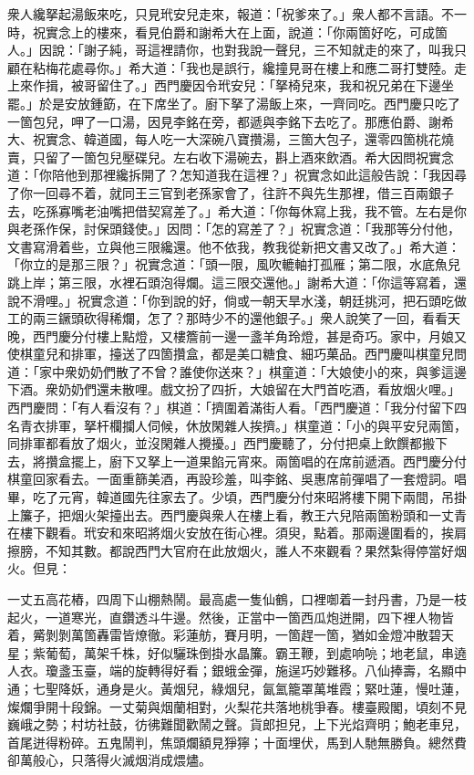 衆人纔拏起湯飯來吃，只見玳安兒走來，報道：「祝爹來了。」{}衆人都不言語。{}不一時，祝實念上的樓來，看見伯爵和謝希大在上面，說道：「你兩箇好吃，可成箇人。」因說：「謝子純，哥這裡請你，也對我說一聲兒，三不知就走的來了，叫我只顧在粘梅花處尋你。」希大道：「我也是誤行，纔撞見哥在樓上和應二哥打雙陸。走上來作揖，被哥留住了。」西門慶因令玳安兒：「拏椅兒來，我和祝兄弟在下邊坐罷。」於是安放鍾筯，在下席坐了。廚下拏了湯飯上來，一齊同吃。西門慶只吃了一箇包兒，呷了一口湯，因見李銘在旁，都遞與李銘下去吃了。那應伯爵、謝希大、祝實念、韓道國，每人吃一大深碗八寶攢湯，三箇大包子，還零四箇桃花燒賣，只留了一箇包兒壓碟兒。左右收下湯碗去，斟上酒來飲酒。希大因問祝實念道：「你陪他到那裡纔拆開了？怎知道我在這裡？」祝實念如此這般告說：「我因尋了你一回尋不着，就同王三官到老孫家會了，往許不與先生{}那裡，借三百兩銀子去，吃孫寡嘴老油嘴把借契寫差了。」希大道：「你每休寫上我，我不管。左右是你與老孫作保，討保頭錢使。」因問：「怎的寫差了？」祝實念道：「我那等分付他，文書寫滑着些，立與他三限纔還。他不依我，教我從新把文書又改了。」希大道：「你立的是那三限？」祝實念道：「頭一限，風吹轆軸打孤雁；第二限，水底魚兒跳上岸；第三限，水裡石頭泡得爛。這三限交還他。」謝希大道：「你這等寫着，還說不滑哩。」祝實念道：「你到說的好，倘或一朝天旱水淺，朝廷挑河，把石頭吃做工的兩三鐝頭砍得稀爛，怎了？那時少不的還他銀子。」{}衆人說笑了一回，看看天晚，西門慶分付樓上點燈，又樓簷前一邊一盞羊角玲燈，甚是奇巧。家中，月娘又使棋童兒和排軍，擡送了四箇攢盒，都是美口糖食、細巧菓品。西門慶叫棋童兒問道：「家中衆奶奶們散了不曾？誰使你送來？」棋童道：「大娘使小的來，與爹這邊下酒。衆奶奶們還未散哩。戲文扮了四折，大娘留在大門首吃酒，看放烟火哩。」西門慶問：「有人看沒有？」棋道：「擠圍着滿街人看。「西門慶道：「我分付留下四名青衣排軍，拏杆欄攔人伺候，休放閑雜人挨擠。」棋童道：「小的與平安兒兩箇，同排軍都看放了烟火，並沒閑雜人攪擾。」西門慶聽了，分付把桌上飲饌都搬下去，將攢盒擺上，廚下又拏上一道果餡元宵來。兩箇唱的在席前遞酒。西門慶分付棋童回家看去。一面重篩美酒，再設珍羞，叫李銘、吳惠席前彈唱了一套燈詞。唱畢，吃了元宵，韓道國先往家去了。{}少頃，西門慶分付來昭將樓下開下兩間，吊掛上簾子，把烟火架擡出去。西門慶與衆人在樓上看，教王六兒陪兩箇粉頭和一丈青在樓下觀看。玳安和來昭將烟火安放在街心裡。須臾，點着。那兩邊圍看的，挨肩擦膀，不知其數。都說西門大官府在此放烟火，誰人不來觀看？果然紮得停當好烟火。但見：

\begin{myquote}
一丈五高花樁，四周下山棚熱鬧。最高處一隻仙鶴，口裡啣着一封丹書，乃是一枝起火，一道寒光，直鑽透斗牛邊。然後，正當中一箇西瓜炮迸開，四下裡人物皆着，觱剝剝萬箇轟雷皆燎徹。彩蓮舫，賽月明，一箇趕一箇，猶如金燈冲散碧天星；紫葡萄，萬架千株，好似驪珠倒掛水晶簾。霸王鞭，到處响喨；地老鼠，串遶人衣。瓊盞玉臺，端的旋轉得好看；銀蛾金彈，施逞巧妙難移。八仙捧壽，名顯中通；七聖降妖，通身是火。黃烟兒，綠烟兒，氤氳籠罩萬堆霞；緊吐蓮，慢吐蓮，燦爛爭開十段錦。一丈菊與烟蘭相對，火梨花共落地桃爭春。樓臺殿閣，頃刻不見巍峨之勢；村坊社鼓，彷彿難聞歡鬧之聲。貨郎担兒，上下光焰齊明；鮑老車兒，首尾迸得粉碎。五鬼鬧判，焦頭爛額見猙獰；十面埋伏，馬到人馳無勝負。總然費卻萬般心，只落得火滅烟消成煨燼。
\end{myquote}


